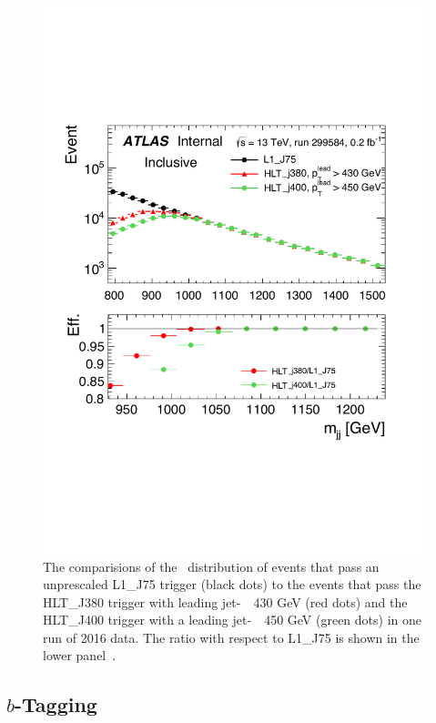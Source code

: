 \begin{figure}[!ht]
  \begin{center}
    \includegraphics[width=0.8\linewidth, angle=0]{figs/Dibjet/ICHEP/evt-mjj.pdf}
  \end{center}
  \caption[The comparisions of the \mjj~distribution of events that pass an unprescaled L1\_J75 trigger (black dots) to the
    events that pass the HLT\_J380 trigger with leading jet-\pT~\gt~430 GeV (red dots) and 
    the HLT\_J400 trigger with a leading jet-\pT~\gt~450 GeV (green dots) in one run of 2016 data.
    The ratio with respect to L1\_J75 is shown in the lower panel.]
        {The comparisions of the \mjj~distribution of events that pass an unprescaled L1\_J75 trigger (black dots) to the
    events that pass the HLT\_J380 trigger with leading jet-\pT~\gt~430 GeV (red dots) and 
    the HLT\_J400 trigger with a leading jet-\pT~\gt~450 GeV (green dots) in one run of 2016 data.
    The ratio with respect to L1\_J75 is shown in the lower panel~\cite{dibjet-ichep_conf}.}
  \label{fig:evt-mjj}
\end{figure}

\subsection{$b$-Tagging}
\label{sec:evt-sel-btag}


